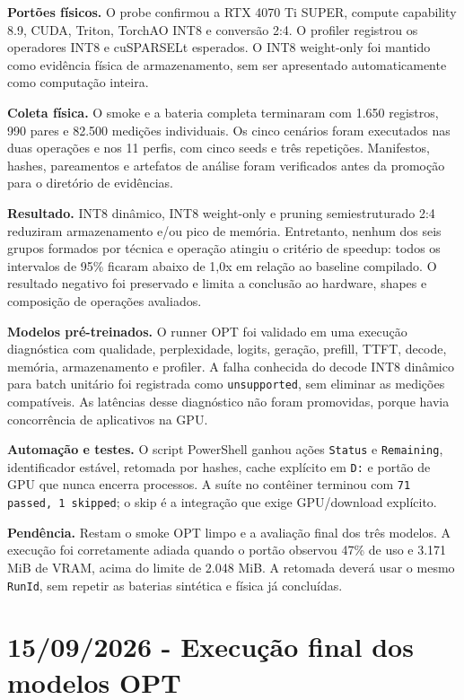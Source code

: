 \textbf{Portões físicos.} O probe confirmou a RTX 4070 Ti SUPER, compute
capability 8.9, CUDA, Triton, TorchAO INT8 e conversão 2:4. O profiler registrou
os operadores INT8 e cuSPARSELt esperados. O INT8 weight-only foi mantido como
evidência física de armazenamento, sem ser apresentado automaticamente como
computação inteira.

\textbf{Coleta física.} O smoke e a bateria completa terminaram com 1.650
registros, 990 pares e 82.500 medições individuais. Os cinco cenários foram
executados nas duas operações e nos 11 perfis, com cinco seeds e três
repetições. Manifestos, hashes, pareamentos e artefatos de análise foram
verificados antes da promoção para o diretório de evidências.

\textbf{Resultado.} INT8 dinâmico, INT8 weight-only e pruning semiestruturado
2:4 reduziram armazenamento e/ou pico de memória. Entretanto, nenhum dos seis
grupos formados por técnica e operação atingiu o critério de speedup: todos os
intervalos de 95\% ficaram abaixo de 1,0x em relação ao baseline compilado. O
resultado negativo foi preservado e limita a conclusão ao hardware, shapes e
composição de operações avaliados.

\textbf{Modelos pré-treinados.} O runner OPT foi validado em uma execução
diagnóstica com qualidade, perplexidade, logits, geração, prefill, TTFT, decode,
memória, armazenamento e profiler. A falha conhecida do decode INT8 dinâmico
para batch unitário foi registrada como \texttt{unsupported}, sem eliminar as
medições compatíveis. As latências desse diagnóstico não foram promovidas,
porque havia concorrência de aplicativos na GPU.

\textbf{Automação e testes.} O script PowerShell ganhou ações
\texttt{Status} e \texttt{Remaining}, identificador estável, retomada por hashes,
cache explícito em \texttt{D:} e portão de GPU que nunca encerra processos. A
suíte no contêiner terminou com \texttt{71 passed, 1 skipped}; o skip é a
integração que exige GPU/download explícito.

\textbf{Pendência.} Restam o smoke OPT limpo e a avaliação final dos três
modelos. A execução foi corretamente adiada quando o portão observou 47\% de uso
e 3.171 MiB de VRAM, acima do limite de 2.048 MiB. A retomada deverá usar o mesmo
\texttt{RunId}, sem repetir as baterias sintética e física já concluídas.

\section{15/09/2026 - Execução final dos modelos OPT}

